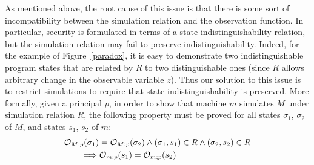 As mentioned above, the root cause of this issue is that there
is some sort of incompatibility between the simulation relation
and the observation function. In particular, security is
formulated in terms of a state indistinguishability relation, but 
the simulation relation may fail to preserve indistinguishability. 
Indeed, for the example of Figure~\ref{paradox}, it is easy to 
demonstrate two indistinguishable program states that are related
by $R$ to two distinguishable ones (since $R$ allows arbitrary change 
in the observable variable $z$). Thus our solution to this 
issue is to restrict simulations to require that state 
indistinguishability is preserved. More formally, given a principal
$p$, in order to show that machine $m$ simulates $M$ under 
simulation relation $R$, the following property must be proved 
for all states $\sigma_1$, $\sigma_2$ of $M$, and
states $s_1$, $s_2$ of $m$:
{\small
\begin{align*}
& \mathcal{O}_{M;p}(\sigma_1) = \mathcal{O}_{M;p}(\sigma_2) \land
(\sigma_1,s_1) \in R \land (\sigma_2,s_2) \in R \\
& \qquad \Longrightarrow
\mathcal{O}_{m;p}(s_1) = \mathcal{O}_{m;p}(s_2)
\end{align*}}%

